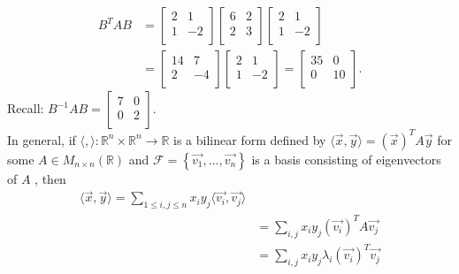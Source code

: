 \documentclass{report}
\begin{document}
{  \begin{align*}
   B ^{T} A B &= \begin{bmatrix}
   2 & 1\\
   1 & -2\\
   \end{bmatrix} \begin{bmatrix}
   6 & 2\\
   2 & 3\\
   \end{bmatrix} \begin{bmatrix}
   2 & 1\\
   1 & -2\\
   \end{bmatrix}\\
   &= \begin{bmatrix}
   14 & 7\\
   2 & -4\\
   \end{bmatrix} \begin{bmatrix}
   2 & 1\\
   1 & -2\\
   \end{bmatrix}= \begin{bmatrix}
   35 & 0\\
   0 & 10\\
   \end{bmatrix}
  .\end{align*}
  Recall: $ B^{-1} A B = \begin{bmatrix}
  7 & 0\\
  0 & 2\\
  \end{bmatrix}$.\\
  In general, if $ \langle ,  \rangle : \mathbb{R} ^{n} \times  \mathbb{R} ^{n} \to \mathbb{R}$ is a bilinear form defined by $ \langle \vec{ x} ,\vec{ y}   \rangle = \left( \vec{ x}  \right) ^{T} A \vec{ y} $ for some $ A \in M_{n\times n} \left( \mathbb{R} \right) $ and $ \mathcal{F} = \left\{ \vec{ v_1} , \ldots , \vec{ v_n}  \right\} $ is a basis consisting of eigenvectors of $ A$ , then
  \begin{align*}
   \langle \vec{ x} ,\vec{ y}   \rangle = \sum\limits_{1 \leq i , j \leq n}^{}  x_i y_j \langle \vec{ v_i} ,\vec{ v_j}   \rangle \\
   &= \sum\limits_{i , j } ^{}  x_i y_j \left( \vec{ v_i}  \right) ^{T} A \vec{ v_j} \\
   &= \sum\limits_{i , j } ^{}  x_i y_j \lambda _i \left( \vec{ v_i}  \right) ^{T} \vec{ v_j} \\

\end{align*}}
\end{document}
